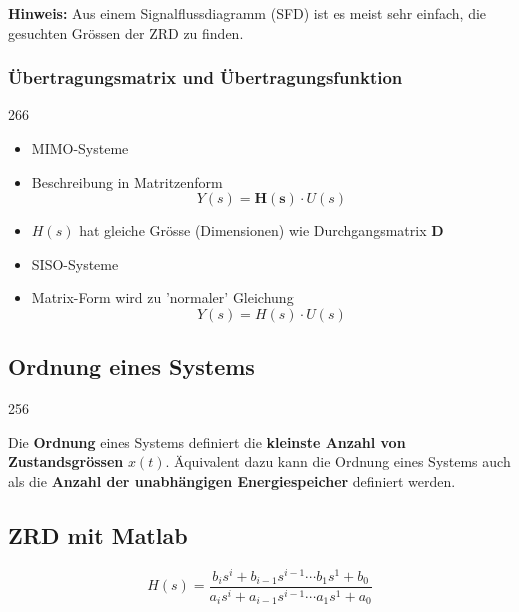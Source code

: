 \textbf{Hinweis:} Aus einem Signalflussdiagramm (SFD) ist es meist sehr einfach, die gesuchten Grössen der ZRD zu finden.


\subsubsection{Übertragungsmatrix und Übertragungsfunktion}{266}

\begin{minipage}[t]{0.48\columnwidth}
    \begin{center}
        \textbf{}
    \end{center}
    \begin{itemize}
        \item MIMO-Systeme
        \item Beschreibung in Matritzenform
            $$ Y(s) = \bm{H(s)} \cdot U(s) $$
        \item  $H(s)$ hat gleiche Grösse (Dimensionen) wie Durchgangsmatrix $\bm{D}$
    \end{itemize}
\end{minipage}
\hfill
\begin{minipage}[t]{0.48\columnwidth}
    \begin{center}
        \textbf{}
    \end{center}
        \begin{itemize}
            \item SISO-Systeme
            \item Matrix-Form wird zu 'normaler' Gleichung
            $$ Y(s) = H(s) \cdot U(s) $$
        \end{itemize}
\end{minipage}


\subsection{Ordnung eines Systems}{256}

Die \textbf{Ordnung} eines Systems definiert die \textbf{kleinste Anzahl von Zustandsgrössen} $x(t)$.
Äquivalent dazu kann die Ordnung eines Systems auch als die \textbf{Anzahl der unabhängigen Energiespeicher} definiert werden.


\subsection{ZRD mit Matlab}

$$ H(s) = \frac{b_i s^i + b_{i-1} s^{i-1} \cdots b_1 s^1 + b_0}{a_i s^i + a_{i-1} s^{i-1} \cdots a_1 s^1 + a_0} $$



